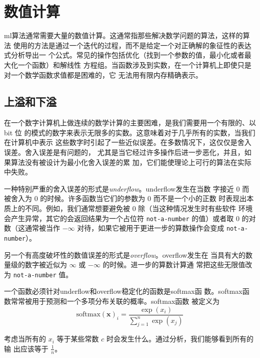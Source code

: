 \chapter{数值计算}
\label{ch:numerical}

\gls*{ml}算法通常需要大量的数值计算。这通常指那些解决数学问题的算法，这样的算法
使用的方法是通过一个迭代的过程，而不是给定一个对正确解的象征性的表达式分析导出一
个公式。常见的操作包括优化（找到一个参数的值，最小化或者最大化一个函数）和解线性
方程组。当函数涉及到实数，在一个计算机上即使只是对一个数学函数求值都是困难的，它
无法用有限内存精确表示。

\section{上溢和下溢}
\label{sec:overflow_and_underflow}

在一个数字计算机上做连续的数学计算的主要困难，是我们需要用一个有限的、以 bit 位
的模式的数字来表示无限多的实数。这意味着对于几乎所有的实数，当我们在计算机中表示
这些数字时引起了一些近似误差。在多数情况下，这仅仅是舍入误差。舍入误差是有问题的，
尤其是当它经过许多操作后进一步恶化，并且，如果算法没有被设计为最小化舍入误差的累
加，它们能使理论上可行的算法在实际中失败。

一种特别严重的舍入误差的形式是\emph{\gls{underflow}}。\gls*{underflow}发生在当数
字接近 $0$ 而被舍入为 $0$ 的时候。许多函数当它们的参数为 $0$ 而不是一个小的正数
时表现出本质上的不同。例如，我们通常想要避免被 $0$ 除（当这种情况发生时有些软件
  环境会产生异常，其它的会返回结果为一个占位符 \verb!not-a-number! 的值）或者取
$0$ 的对数（这通常被当作 $-\infty$ 对待，如果它被用于更进一步的算数操作会变成
  \verb!not-a-number!）。

另一个有高度破坏性的数值误差的形式是\emph{\gls{overflow}}。\gls*{overflow}发生在
当具有大的数量级的数字被近似为 $\infty$ 或 $-\infty$ 的时候。进一步的算数计算通
常把这些无限值改为 \verb!not-a-number! 值。

一个函数必须针对\gls*{underflow}和\gls*{overflow}稳定化的函数是\gls*{softmax}函
数。\gls*{softmax}函数常常被用于预测和一个多项分布关联的概率。\gls*{softmax}函数
被定义为
\begin{equation}
  \mathrm{softmax}(\pmb{x})_i = \frac{\exp(x_i)}{\sum_{j=1}^n\exp(x_j)}
\end{equation}

考虑当所有的 $x_i$ 等于某些常数 $c$ 时会发生什么。通过分析，我们能够看到所有的输
出应该等于 $\frac{1}{n}$。
